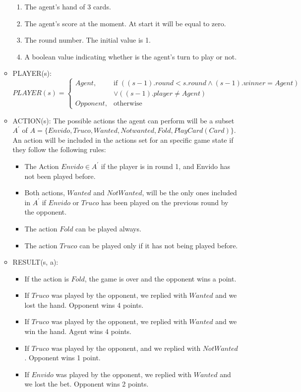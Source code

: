 \documentclass{article}
\begin{document}
\begin{enumerate}
\begin{itemize}
\begin{enumerate}
		\item The agent's hand of 3 cards.
		\item The agent's score at the moment. At start it will be equal to zero.      
		\item The round number. The initial value is 1.
		\item A boolean value indicating whether is the agent's turn to play or not.
	\end{enumerate}
	\item PLAYER(s):
	\[
	PLAYER(s) = 
	\begin{cases}
	Agent,& \text{if } ((s-1).round < s.round \land (s-1).winner = Agent) \\ 
	& \lor ((s-1).player \neq Agent)  \\
	Opponent,              & \text{otherwise}
	\end{cases}
	\]
	\item ACTION(s):
	The possible actions the agent can perform will be a subset $A^\prime$ of $A = \{Envido, Truco, Wanted, Not wanted, Fold, PlayCard(Card) \}$. An action will be included in the actions set for an specific game state if they follow the following rules:
	\begin{itemize}
		\item The Action $Envido \in A^\prime$ if the player is in round 1, and Envido has not been played before.
		\item Both actions, $Wanted$ and $Not Wanted$, will be the only ones included in $A^\prime$ if $Envido$ or $Truco$ has been played on the previous round by the opponent.
		\item The action $Fold$ can be played always.
		\item The action $Truco$ can be played only if it has not being played before.
	\end{itemize}
	\item RESULT(s, a): 
	\begin{itemize}
		\item If the action is $Fold$, the game is over and the opponent wins a point.
		\item If $Truco$ was played by the opponent, we replied with $Wanted$ and we lost the hand. Opponent wins 4 points.
		\item If $Truco$ was played by the opponent, we replied with $Wanted$ and we win the hand. Agent wins 4 points.
		\item If $Truco$ was played by the opponent, and we replied with $Not Wanted$. Opponent wins 1 point.
		\item If $Envido$ was played by the opponent, we replied with $Wanted$ and we lost the bet. Opponent wins 2 points.

\end{itemize}
\end{itemize}
\end{enumerate}
\end{document}
